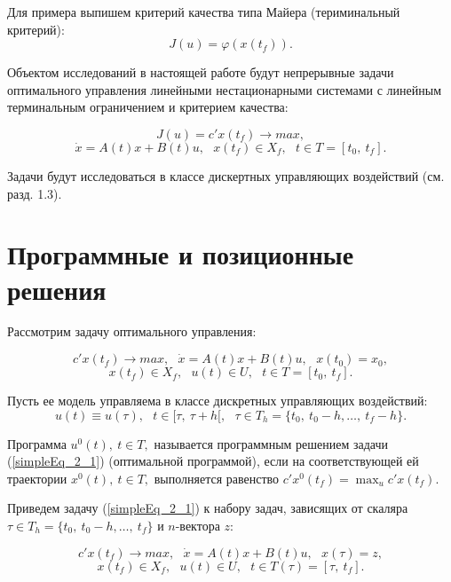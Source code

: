 Для примера выпишем критерий качества типа Майера (териминальный критерий):
\[ J(u) = \varphi (x(t_f)). \]


Объектом исследований в настоящей работе будут непрерывные задачи оптимального управления линейными нестационарными системами с линейным терминальным ограничением и критерием качества:


\begin{equation}
    J(u) = c'x(t_f) \to max,
\end{equation} 
\[ \dot x = A(t)x + B(t)u,~~~x(t_f) \in X_f,~~~t \in T = [t_0,~t_f].\]

Задачи будут исследоваться в классе дискертных управляющих воздействий (см. разд. 1.3).


\section{Программные и позиционные решения}\label{1_2}
Рассмотрим задачу оптимального управления:


\begin{equation}\label{simpleEq_2_1}
    c'x(t_f) \to max,~~~\dot x = A(t)x + B(t)u,~~~x(t_0) = x_0,
\end{equation} 
\[ x(t_f) \in X_f,~~~u(t) \in U, ~~~t \in T = [t_0,~t_f].\]


Пусть ее модель управляема в классе дискретных управляющих воздействий:
\[u(t) \equiv u(\tau), ~~~t \in [\tau, ~\tau + h[,~~~ \tau \in T_h = \{t_0,~ t_0 - h, \dots ,~ t_f - h\}. \]


\begin{definition}   Программа $u^0(t), ~t \in T,$ называется программным решением задачи (\ref{simpleEq_2_1}) (оптимальной программой), если на соответствующей ей траектории $x^0(t), ~t \in T,$ выполняется равенство $c'x^0(t_f) = \max_u c'x(t_f) $.
\end{definition}


Приведем задачу (\ref{simpleEq_2_1}) к набору задач, зависящих от скаляра $\tau \in T_h = \{t_0,~ t_0 - h, \dots ,~ t_f\}$ и $n$-вектора $z$:


\begin{equation}\label{simpleEq_2_2}
    c'x(t_f) \to max,~~~\dot x = A(t)x + B(t)u,~~~x(\tau) = z,
\end{equation} 
\[ x(t_f) \in X_f, ~~~u(t) \in U ,~~~t \in T(\tau) = [\tau,~t_f].\]



